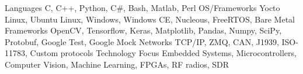 

\begin{cvskills}

  \cvskill
    {Languages} %
    {C, C++, Python, C\#, Bash, Matlab, Perl} %
  \cvskill
    {OS/Frameworks} %
    {Yocto Linux, Ubuntu Linux, Windows, Windows CE, Nucleous, FreeRTOS, Bare Metal} %
  \cvskill
    {Frameworks} %
    {OpenCV, Tensorflow, Keras, Matplotlib, Pandas, Numpy, SciPy, Protobuf, Google Test, Google Mock} %
  \cvskill
    {Networks} %
    {TCP/IP, ZMQ, CAN, J1939, ISO-11783, Custom protocols} %
  \cvskill
    {Technology Focus} %
    {Embedded Systems, Microcontrollers, Computer Vision, Machine Learning, FPGAs, RF radios, SDR} %

\end{cvskills}

